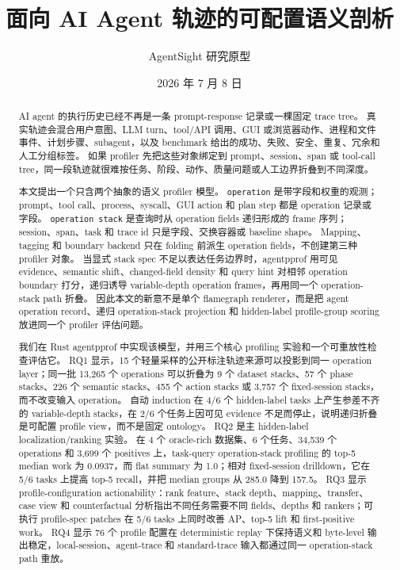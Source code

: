 \documentclass[10pt,twocolumn]{ctexart}
\title{\vspace{-1.2em}面向 AI Agent 轨迹的可配置语义剖析}
\author{AgentSight 研究原型}
\date{2026 年 7 月 8 日}
\newcommand{\toolname}{agentpprof}
\newcommand{\op}{\texttt{operation}}
\newcommand{\opstack}{\texttt{operation stack}}
\begin{document}
\maketitle
\vspace{-1.4em}

\begin{abstract}
AI agent 的执行历史已经不再是一条 prompt-response 记录或一棵固定 trace tree。
真实轨迹会混合用户意图、LLM turn、tool/API 调用、GUI 或浏览器动作、进程和文件事件、计划步骤、subagent，以及 benchmark 给出的成功、失败、安全、重复、冗余和人工分组标签。
如果 profiler 先把这些对象绑定到 prompt、session、span 或 tool-call tree，同一段轨迹就很难按任务、阶段、动作、质量问题或人工边界折叠到不同深度。

本文提出一个只含两个抽象的语义 profiler 模型。
\op{} 是带字段和权重的观测；prompt、tool call、process、syscall、GUI action 和 plan step 都是 operation 记录或字段。
\opstack{} 是查询时从 operation fields 递归形成的 frame 序列；session、span、task 和 trace id 只是字段、交换容器或 baseline shape。
Mapping、tagging 和 boundary backend 只在 folding 前派生 operation fields，不创建第三种 profiler 对象。
当显式 stack spec 不足以表达任务边界时，\toolname{} 用可见 evidence、semantic shift、changed-field density 和 query hint 对相邻 operation boundary 打分，递归诱导 variable-depth operation frames，再用同一个 operation-stack path 折叠。
因此本文的新意不是单个 flamegraph renderer，而是把 agent operation record、递归 operation-stack projection 和 hidden-label profile-group scoring 放进同一个 profiler 评估问题。

我们在 Rust \toolname{} 中实现该模型，并用三个核心 profiling 实验和一个可重放性检查评估它。
RQ1 显示，15 个轻量采样的公开标注轨迹来源可以投影到同一 operation layer；同一批 13,265 个 operations 可以折叠为 9 个 dataset stacks、57 个 phase stacks、226 个 semantic stacks、455 个 action stacks 或 3,757 个 fixed-session stacks，而不改变输入 operation。
自动 induction 在 4/6 个 hidden-label tasks 上产生参差不齐的 variable-depth stacks，在 2/6 个任务上因可见 evidence 不足而停止，说明递归折叠是可配置 profile view，而不是固定 ontology。
RQ2 是主 hidden-label localization/ranking 实验。
在 4 个 oracle-rich 数据集、6 个任务、34,539 个 operations 和 3,699 个 positives 上，task-query operation-stack profiling 的 top-5 median work 为 0.0937，而 flat summary 为 1.0；相对 fixed-session drilldown，它在 5/6 tasks 上提高 top-5 recall，并把 median groups 从 285.0 降到 157.5。
RQ3 显示 profile-configuration actionability：rank feature、stack depth、mapping、transfer、case view 和 counterfactual 分析指出不同任务需要不同 fields、depths 和 rankers；可执行 profile-spec patches 在 5/6 tasks 上同时改善 AP、top-5 lift 和 first-positive work。
RQ4 显示 76 个 profile 配置在 deterministic replay 下保持语义和 byte-level 输出稳定，local-session、agent-trace 和 standard-trace 输入都通过同一 operation-stack path 重放。


\end{abstract}
\end{document}
